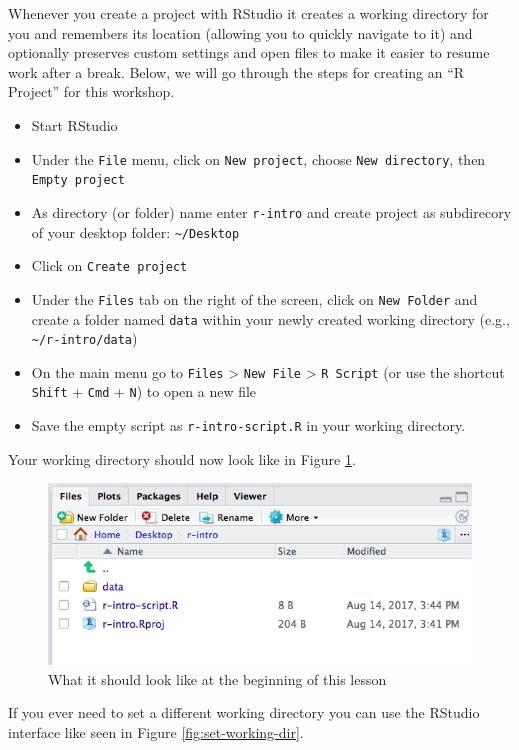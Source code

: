 \documentclass[
]{book}
\providecommand{\tightlist}{%
  \setlength{\itemsep}{0pt}\setlength{\parskip}{0pt}}
\begin{document}
Whenever you create a project with RStudio it creates a working directory for you and remembers
its location (allowing you to quickly navigate to it) and optionally preserves
custom settings and open files to make it easier to resume work after a
break. Below, we will go through the steps for creating an ``R Project'' for this
workshop.

\begin{itemize}
\tightlist
\item
  Start RStudio
\item
  Under the \texttt{File} menu, click on \texttt{New\ project}, choose \texttt{New\ directory}, then
  \texttt{Empty\ project}
\item
  As directory (or folder) name enter \texttt{r-intro} and create project as subdirecory of your desktop folder: \texttt{\textasciitilde{}/Desktop}
\item
  Click on \texttt{Create\ project}
\item
  Under the \texttt{Files} tab on the right of the screen, click on \texttt{New\ Folder} and
  create a folder named \texttt{data} within your newly created working directory (e.g., \texttt{\textasciitilde{}/r-intro/data})
\item
  On the main menu go to \texttt{Files} \textgreater{} \texttt{New\ File} \textgreater{} \texttt{R\ Script} (or use the shortcut \texttt{Shift} + \texttt{Cmd} + \texttt{N}) to open a new file
\item
  Save the empty script as \texttt{r-intro-script.R} in your working directory.
\end{itemize}

Your working directory should now look like in Figure \ref{fig:working-dir}.

\begin{figure}
\includegraphics[width=0.6\linewidth]{img/Rproject-setup} \caption{What it should look like at the beginning of this lesson}\label{fig:working-dir}
\end{figure}

If you ever need to set a different working directory you can use the RStudio interface like seen in Figure \ref{fig:set-working-dir}.
\end{document}
